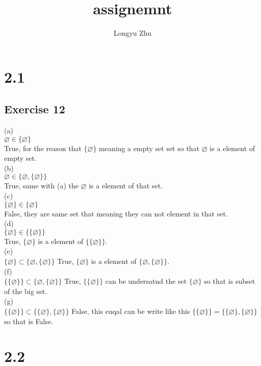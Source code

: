 \documentclass[12pt]{article}
\title{assignemnt}
\author{Longyu Zhu}
\begin{document}
\section*{2.1}
\subsection*{Exercise 12}
(a)\\
$\varnothing  \in \{\varnothing \}$\\
True, for the reason that $\{\varnothing \}$ meaning a empty set set so that $\varnothing$ is a element of empty set.\\

(b)\\
$\varnothing\in \{\varnothing ,\{\varnothing \}\}$\\
True, same with (a) the $\varnothing$ is a element of that set.\\

(c)\\
$\{\varnothing \}\in \{\varnothing \}$\\
False, they are same set that meaning they can not element in that set.\\

(d)\\
$\{\varnothing \}\in \{\{\varnothing \}\}$\\
True, $\{\varnothing\}$ is a element of $\{\{\varnothing\}\}$.\\

(e)\\
$\{\varnothing \}\subset \{\varnothing ,\{\varnothing \}\}$
True, $\{\varnothing\}$ is a element of $\{\varnothing,\{\varnothing\}\}$.\\

(f)\\
$\{\{\varnothing \}\}\subset \{\varnothing ,\{\varnothing \}\}$
True, $\{\{\varnothing\}\}$ can be undersatnd the set $\{\varnothing\}$ so that is subset of the big set.\\

(g)\\
$\{\{\varnothing \}\}\subset \{\{\varnothing \},\{\varnothing \}\}$
False, this euqal can be write like this $\{\{\varnothing \}\}= \{\{\varnothing \},\{\varnothing \}\}$ so that is False.\\

\section*{2.2}
\end{document}
